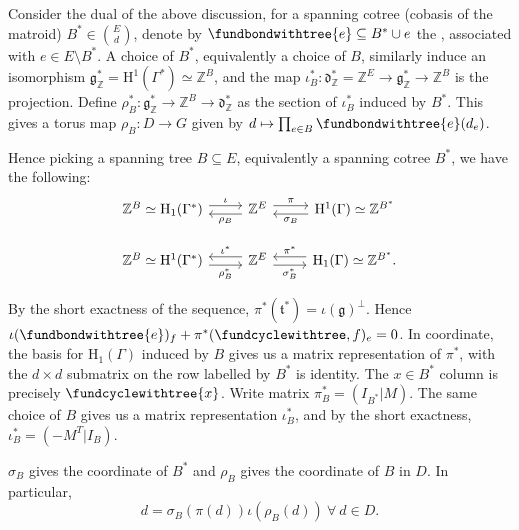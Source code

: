 \documentclass[b5paper]{article}
\newcommand{\del}{\setminus}
\newcommand{\HH}{\mathrm{H}}
\begin{document}
Consider the dual of the above discussion, for a spanning cotree (cobasis of the matroid) $B^*\in \binom{E}{d}$, denote by $\fundbondwithtree{e}\subseteq B^*\cup e$ the , associated with $e\in E\del B^*$.
A choice of $B^*$, equivalently a choice of $B$, similarly induce an isomorphism $\mathfrak{g}_\mathbb{Z}^*=\HH^1(\Gamma^*)\simeq \mathbb{Z}^B$, and the map $\iota^*_B:\mathfrak{d}_\mathbb{Z}^*=\mathbb{Z}^E\rightarrow \mathfrak{g}^*_\mathbb{Z}\rightarrow \mathbb{Z}^B$ is the projection. Define $\rho_B^*:\mathfrak{g}_\mathbb{Z}^*\rightarrow \mathbb{Z}^{B}\rightarrow \mathfrak{d}^*_\mathbb{Z}$ as the section of $\iota^*_B$ induced by $B^*$. This gives a torus map $\rho_B:D\rightarrow G$ given by $d\mapsto \prod_{e\in B}^{}\fundbondwithtree{e}(d_e)$.

Hence picking a spanning tree $B\subseteq E$, equivalently a spanning cotree $B^*$, we have the following:
\begin{equation*}
    \begin{tikzcd}
      \mathbb{Z}^B\simeq \HH_1(\Gamma^*) \arrow[r, "\iota", yshift=0.3em] & \arrow[l, "\rho_B", yshift=-0.3em]\mathbb{Z}^E \arrow[r, "\pi", yshift=0.3em] & \arrow[l, "\sigma_B", yshift=-0.3em] \HH^1(\Gamma)\simeq \mathbb{Z}^{B^*}\\
      \mathbb{Z}^B\simeq \HH^1(\Gamma^*) \arrow[r, "\rho^*_B"', yshift=-0.3em] & \arrow[l, "\iota^*"', yshift=+0.3em]\mathbb{Z}^E \arrow[r, "\sigma_B^*"', yshift=-0.3em] & \arrow[l, "\pi^*"', yshift=0.3em] \HH_1(\Gamma)\simeq \mathbb{Z}^{B^*}.
    \end{tikzcd}
\end{equation*}

\begin{remark}
  By the short exactness of the sequence, $\pi^*(\mathfrak{t}^*)=\iota(\mathfrak{g})^\perp $. Hence $\iota(\fundbondwithtree{e})_f+\pi^*(\fundcyclewithtree,f)_e=0$. In coordinate, the basis for $\HH_1(\Gamma)$ induced by $B$ gives us a matrix representation of $\pi^*$, with the $d\times d$ submatrix on the row labelled by $B^*$ is identity. The $x\in B^*$ column is precisely $\fundcyclewithtree{x}$. Write matrix $\pi^*_B=(I_{B^*}|M)$. The same choice of $B$ gives us a matrix representation $\iota^*_B$, and by the short exactness, $\iota^*_B=(-M^T|I_B)$.
\end{remark}

\begin{proposition}[pps:]{}
  $\sigma_B$ gives the coordinate of $B^*$ and $\rho_B$ gives the coordinate of $B$ in $D$. In particular,
  \[
    d=\sigma_B(\pi(d))\iota(\rho_B(d))\ \forall\ d\in D.
  \]
\end{proposition}
\end{document}
